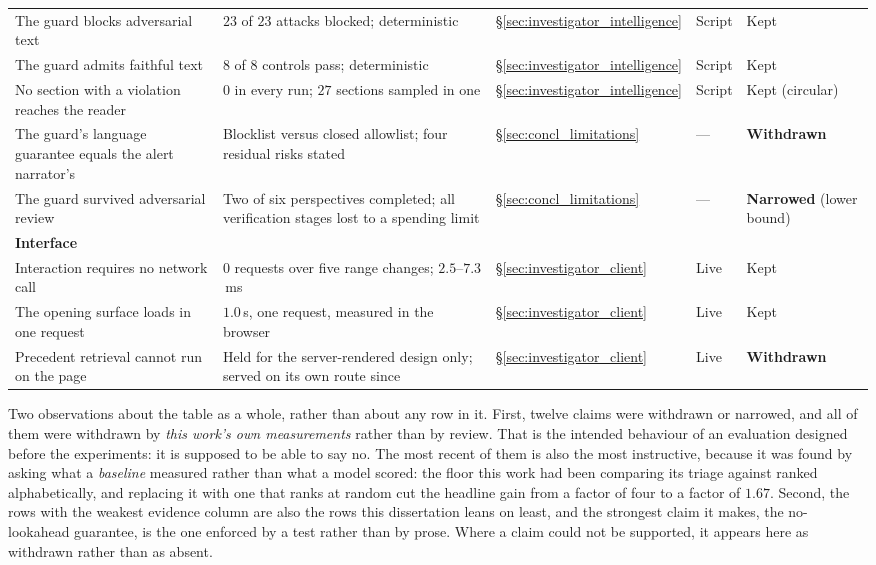 \begin{table}[ht]
\begin{tabular}{p{4.6cm} p{3.5cm} p{1.6cm} p{1.2cm} p{1.7cm}}
The guard blocks adversarial text & $23$ of $23$ attacks blocked; deterministic & §\ref{sec:investigator_intelligence} & Script & Kept \\
The guard admits faithful text & $8$ of $8$ controls pass; deterministic & §\ref{sec:investigator_intelligence} & Script & Kept \\
No section with a violation reaches the reader & $0$ in every run; $27$ sections sampled in one & §\ref{sec:investigator_intelligence} & Script & Kept (circular) \\
The guard's language guarantee equals the alert narrator's & Blocklist versus closed allowlist; four residual risks stated & §\ref{sec:concl_limitations} & --- & \textbf{Withdrawn} \\
The guard survived adversarial review & Two of six perspectives completed; all verification stages lost to a spending limit & §\ref{sec:concl_limitations} & --- & \textbf{Narrowed} (lower bound) \\
\midrule
\multicolumn{5}{l}{\textbf{Interface}} \\
Interaction requires no network call & $0$ requests over five range changes; $2.5$--$7.3$\,ms & §\ref{sec:investigator_client} & Live & Kept \\
The opening surface loads in one request & $1.0$\,s, one request, measured in the browser & §\ref{sec:investigator_client} & Live & Kept \\
Precedent retrieval cannot run on the page & Held for the server-rendered design only; served on its own route since & §\ref{sec:investigator_client} & Live & \textbf{Withdrawn} \\
\bottomrule
\end{tabular}
\end{table}

Two observations about the table as a whole, rather than about any row in it. First, twelve claims were
withdrawn or narrowed, and all of them were withdrawn by \emph{this work's own measurements} rather
than by review. That is the intended behaviour of an evaluation designed before the experiments: it is
supposed to be able to say no. The most recent of them is also the most instructive, because it was
found by asking what a \emph{baseline} measured rather than what a model scored: the floor this work
had been comparing its triage against ranked alphabetically, and replacing it with one that ranks at
random cut the headline gain from a factor of four to a factor of $1.67$. Second, the rows with the weakest evidence column are also the rows
this dissertation leans on least, and the strongest claim it makes, the no-lookahead guarantee, is the
one enforced by a test rather than by prose. Where a claim could not be supported, it appears here as
withdrawn rather than as absent.

